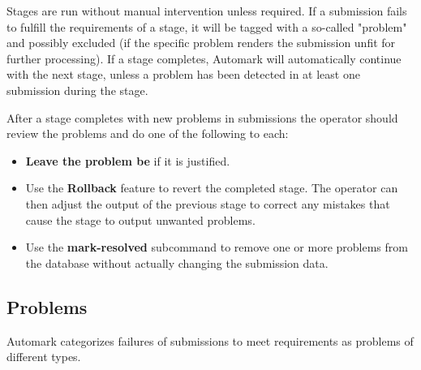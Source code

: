 \documentclass[12pt,a4paper,oneside]{report}
\begin{document}
	Stages are run without manual intervention unless required. If a submission fails to fulfill the requirements of a stage, it will be tagged with a so-called "problem" and possibly excluded (if the specific problem renders the submission unfit for further processing). If a stage completes, Automark will automatically continue with the next stage, unless a problem has been detected in at least one submission during the stage.

	After a stage completes with new problems in submissions the operator should review the problems and do one of the following to each:
	\begin{itemize}
		\item \textbf{Leave the problem be} if it is justified.
		\item Use the \textbf{Rollback} feature to revert the completed stage. The operator can then adjust the output of the previous stage to correct any mistakes that cause the stage to output unwanted problems.
		\item Use the \textbf{mark-resolved} subcommand to remove one or more problems from the database without actually changing the submission data.
	\end{itemize}

	\subsection{Problems}
	Automark categorizes failures of submissions to meet requirements as problems of different types.
\end{document}
